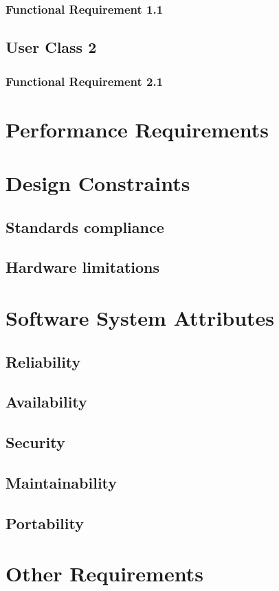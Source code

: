 \documentclass[a4paper,12pt]{book}
\begin{document}
\subsubsection{Functional Requirement 1.1}
\subsection{User Class 2}
\subsubsection{Functional Requirement 2.1}

\newpage
\section{Performance Requirements}

\newpage
\section{Design Constraints}
\subsection{Standards compliance}
\subsection{Hardware limitations}

\newpage
\section{Software System Attributes}
\subsection{Reliability}
\subsection{Availability}
\subsection{Security}
\subsection{Maintainability}
\subsection{Portability}

\newpage
\section{Other Requirements}


\backmatter
\end{document}
